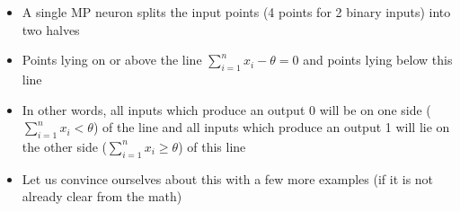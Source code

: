 \documentclass[serif, aspectratio=169]{beamer}
\begin{document}
\begin{frame}
\begin{columns}
\begin{overlayarea}{\textwidth}{\textheight}
\begin{itemize}\justifying
\item<4-> A single MP neuron splits the input points (4 points for 2 binary inputs) into two halves
\item<5-> Points lying on or above the line $\sum_{i=1}^{n} x_i - \theta = 0$ and points lying below this line
\item<6-> In other words, all inputs which produce an output 0 will be on one side ($\sum_{i=1}^{n} x_i < \theta$) of the line and all inputs which produce an  output 1 will lie on the other side ($\sum_{i=1}^{n} x_i \geq \theta$) of this line 
\item<7-> Let us convince ourselves about this with a few more examples (if it is not already clear from the math) 
\end{itemize}
\end{overlayarea}
\end{columns}
\end{frame}
\end{document}
